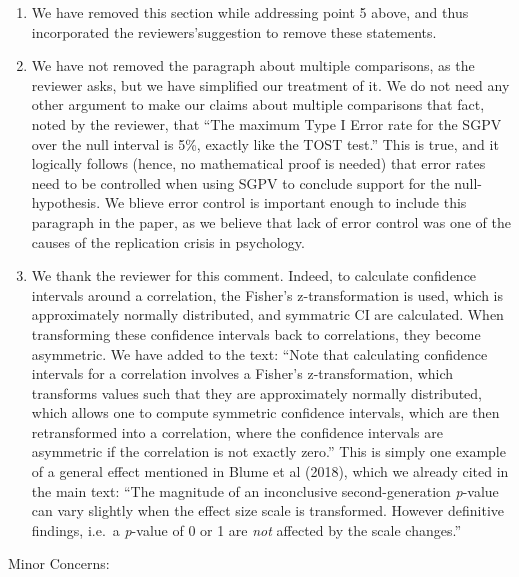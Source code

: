 \documentclass[man]{apa6}
\begin{document}
\begin{enumerate}
\def\labelenumi{\arabic{enumi}.}
\setcounter{enumi}{5}
\item
  We have removed this section while addressing point 5 above, and thus
  incorporated the reviewers'suggestion to remove these statements.
\item
  We have not removed the paragraph about multiple comparisons, as the
  reviewer asks, but we have simplified our treatment of it. We do not
  need any other argument to make our claims about multiple comparisons
  that fact, noted by the reviewer, that \enquote{The maximum Type I
  Error rate for the SGPV over the null interval is 5\%, exactly like
  the TOST test.} This is true, and it logically follows (hence, no
  mathematical proof is needed) that error rates need to be controlled
  when using SGPV to conclude support for the null-hypothesis. We blieve
  error control is important enough to include this paragraph in the
  paper, as we believe that lack of error control was one of the causes
  of the replication crisis in psychology.
\item
  We thank the reviewer for this comment. Indeed, to calculate
  confidence intervals around a correlation, the Fisher's
  z-transformation is used, which is approximately normally distributed,
  and symmatric CI are calculated. When transforming these confidence
  intervals back to correlations, they become asymmetric. We have added
  to the text: \enquote{Note that calculating confidence intervals for a
  correlation involves a Fisher's z-transformation, which transforms
  values such that they are approximately normally distributed, which
  allows one to compute symmetric confidence intervals, which are then
  retransformed into a correlation, where the confidence intervals are
  asymmetric if the correlation is not exactly zero.} This is simply one
  example of a general effect mentioned in Blume et al (2018), which we
  already cited in the main text: \enquote{The magnitude of an
  inconclusive second-generation \emph{p}-value can vary slightly when
  the effect size scale is transformed. However definitive findings,
  i.e.~a \emph{p}-value of 0 or 1 are \emph{not} affected by the scale
  changes.}
\end{enumerate}

Minor Concerns:
\end{document}
